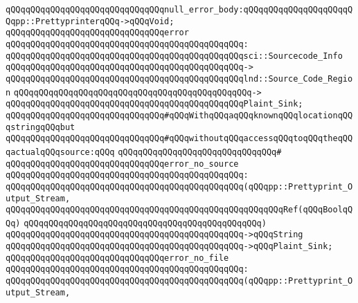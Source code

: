 \verb|qQQqqQQqqQQqqQQqqQQqqQQqqQQqqQQqnull_error_body:qQQqqQQqqQQqqQQqqQQqqQQqpp::PrettyprinterqQQq->qQQqVoid;|\newline
\newline
\verb|qQQqqQQqqQQqqQQqqQQqqQQqqQQqqQQqerror|\newline
\verb|qQQqqQQqqQQqqQQqqQQqqQQqqQQqqQQqqQQqqQQqqQQqqQQq:|\newline
\verb|qQQqqQQqqQQqqQQqqQQqqQQqqQQqqQQqqQQqqQQqqQQqqQQqsci::Sourcecode_Info|\newline
\verb|qQQqqQQqqQQqqQQqqQQqqQQqqQQqqQQqqQQqqQQqqQQqqQQq->|\newline
\verb|qQQqqQQqqQQqqQQqqQQqqQQqqQQqqQQqqQQqqQQqqQQqqQQqlnd::Source_Code_Region|\newline
\verb|qQQqqQQqqQQqqQQqqQQqqQQqqQQqqQQqqQQqqQQqqQQqqQQq->|\newline
\verb|qQQqqQQqqQQqqQQqqQQqqQQqqQQqqQQqqQQqqQQqqQQqqQQqPlaint_Sink;|\newline
\newline
\verb|qQQqqQQqqQQqqQQqqQQqqQQqqQQqqQQq#qQQqWithqQQqaqQQqknownqQQqlocationqQQqstringqQQqbut|\newline
\verb|qQQqqQQqqQQqqQQqqQQqqQQqqQQqqQQq#qQQqwithoutqQQqaccessqQQqtoqQQqtheqQQqactualqQQqsource:qQQq|\newline
\verb|qQQqqQQqqQQqqQQqqQQqqQQqqQQqqQQq#|\newline
\verb|qQQqqQQqqQQqqQQqqQQqqQQqqQQqqQQqerror_no_source|\newline
\verb|qQQqqQQqqQQqqQQqqQQqqQQqqQQqqQQqqQQqqQQqqQQqqQQq:|\newline
\verb|qQQqqQQqqQQqqQQqqQQqqQQqqQQqqQQqqQQqqQQqqQQqqQQq(qQQqpp::Prettyprint_Output_Stream,|\newline
\verb|qQQqqQQqqQQqqQQqqQQqqQQqqQQqqQQqqQQqqQQqqQQqqQQqqQQqqQQqRef(qQQqBoolqQQq)|\newline
\verb|qQQqqQQqqQQqqQQqqQQqqQQqqQQqqQQqqQQqqQQqqQQqqQQq)|\newline
\verb|qQQqqQQqqQQqqQQqqQQqqQQqqQQqqQQqqQQqqQQqqQQqqQQq->qQQqString|\newline
\verb|qQQqqQQqqQQqqQQqqQQqqQQqqQQqqQQqqQQqqQQqqQQqqQQq->qQQqPlaint_Sink;|\newline
\newline
\verb|qQQqqQQqqQQqqQQqqQQqqQQqqQQqqQQqerror_no_file|\newline
\verb|qQQqqQQqqQQqqQQqqQQqqQQqqQQqqQQqqQQqqQQqqQQqqQQq:|\newline
\verb|qQQqqQQqqQQqqQQqqQQqqQQqqQQqqQQqqQQqqQQqqQQqqQQq(qQQqpp::Prettyprint_Output_Stream,|\newline
